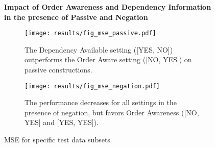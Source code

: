 \begin{figure}[htb!]
	\centering
	\textbf{Impact of Order Awareness and Dependency Information \\ in the presence of Passive and Negation}\par\medskip
	\begin{subfigure}[t]{.5\textwidth}
		\texttt{[image: results/fig\_mse\_passive.pdf]}
		\captionsetup{width=0.9\linewidth}
		\caption{The Dependency Available setting ([YES, NO]) outperforms the Order Aware setting ([NO, YES]) on passive constructions.}
		\label{fig:fig_mse_passive}
	\end{subfigure}%
	\begin{subfigure}[t]{.5\textwidth}
		\texttt{[image: results/fig\_mse\_negation.pdf]}
		\captionsetup{width=0.9\linewidth}
		\caption{The performance decreases for all settings in the presence of negation, but favors Order Awareness ([NO, YES] and [YES, YES]).}
		\label{fig:fig_mse_negation}
	\end{subfigure}	
	\caption{MSE for specific test data subsets}
\end{figure}

